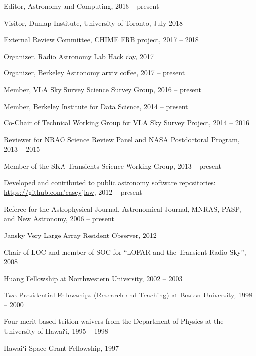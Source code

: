 \documentclass[11pt]{article}
\begin{document}
\begin{bibsection}

    \item Editor, Astronomy and Computing, 2018 -- present
    
    \item Visitor, Dunlap Institute, University of Toronto, July 2018
    
    \item External Review Committee, CHIME FRB project, 2017 -- 2018
    
    \item Organizer, Radio Astronomy Lab Hack day, 2017

    \item Organizer, Berkeley Astronomy arxiv coffee, 2017 -- present
    
    \item Member, VLA Sky Survey Science Survey Group, 2016 -- present

    \item Member, Berkeley Institute for Data Science, 2014 -- present    
    
    \item Co-Chair of Technical Working Group for VLA Sky Survey Project, 2014 -- 2016

    \item Reviewer for NRAO Science Review Panel and NASA Postdoctoral Program, 2013 -- 2015

    \item Member of the SKA Transients Science Working Group, 2013 -- present

    \item Developed and contributed to public astronomy software repositories: \\ \url{https://github.com/caseyjlaw}, 2012 -- present

    \item Referee for the Astrophysical Journal, Astronomical Journal, MNRAS, PASP, and New Astronomy, 2006 -- present

    \item Jansky Very Large Array Resident Observer, 2012

    \item Chair of LOC and member of SOC for ``LOFAR and the Transient Radio Sky'', 2008

    \item Huang Fellowship at Northwestern University, 2002 -- 2003

    \item Two Presidential Fellowships (Research and Teaching) at Boston University, 1998 -- 2000

    \item Four merit-based tuition waivers from the Department of Physics at the University of Hawai`i, 1995 -- 1998

    \item Hawai`i Space Grant Fellowship, 1997

\end{bibsection}
\end{document}

